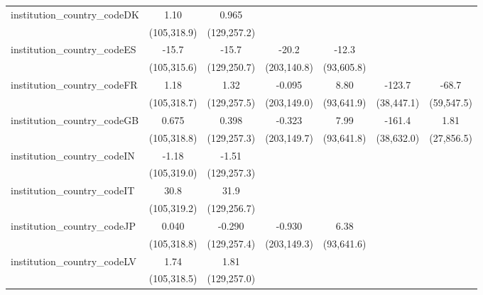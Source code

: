 \begin{tabular}{lcccccc}
   institution\_country\_codeDK          & 1.10          & 0.965         &               &               &              &   \\   
                                         & (105,318.9)   & (129,257.2)   &               &               &              &   \\   
   institution\_country\_codeES          & -15.7         & -15.7         & -20.2         & -12.3         &              &   \\   
                                         & (105,315.6)   & (129,250.7)   & (203,140.8)   & (93,605.8)    &              &   \\   
   institution\_country\_codeFR          & 1.18          & 1.32          & -0.095        & 8.80          & -123.7       & -68.7\\   
                                         & (105,318.7)   & (129,257.5)   & (203,149.0)   & (93,641.9)    & (38,447.1)   & (59,547.5)\\   
   institution\_country\_codeGB          & 0.675         & 0.398         & -0.323        & 7.99          & -161.4       & 1.81\\   
                                         & (105,318.8)   & (129,257.3)   & (203,149.7)   & (93,641.8)    & (38,632.0)   & (27,856.5)\\   
   institution\_country\_codeIN          & -1.18         & -1.51         &               &               &              &   \\   
                                         & (105,319.0)   & (129,257.3)   &               &               &              &   \\   
   institution\_country\_codeIT          & 30.8          & 31.9          &               &               &              &   \\   
                                         & (105,319.2)   & (129,256.7)   &               &               &              &   \\   
   institution\_country\_codeJP          & 0.040         & -0.290        & -0.930        & 6.38          &              &   \\   
                                         & (105,318.8)   & (129,257.4)   & (203,149.3)   & (93,641.6)    &              &   \\   
   institution\_country\_codeLV          & 1.74          & 1.81          &               &               &              &   \\   
                                         & (105,318.5)   & (129,257.0)   &               &               &              &   \\   

\end{tabular}
